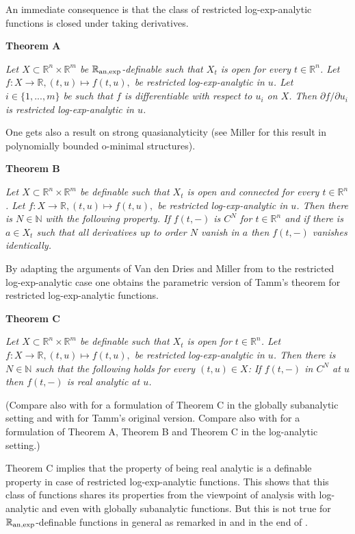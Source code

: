 \documentclass[12pt]{article}
\def\vs{\vspace}
\begin{document}
\vs{0.1cm}
An immediate consequence is that the class of restricted log-exp-analytic functions is closed under taking derivatives. 

\vs{0.4cm}
{\bf Theorem A}

\vs{0.1cm}
{\it
Let $X \subset \mathbb{R}^n \times \mathbb{R}^m$ be $\mathbb{R}_{\textnormal{an,exp}}$-definable such that $X_t$ is open for every $t \in \mathbb{R}^n$. Let $f:X \to \mathbb{R}, (t,u) \mapsto f(t,u),$ be restricted log-exp-analytic in $u$. Let $i \in \{1,...,m\}$ be such that $f$ is differentiable with respect to $u_i$ on $X$. Then $\partial f/\partial u_i$ is restricted log-exp-analytic in $u$.} 

\vs{0.3cm}
One gets also a result on strong quasianalyticity (see Miller \cite{9} for this result in polynomially bounded o-minimal structures).

\vs{0.4cm}
{\bf Theorem B}

\vs{0.1cm}
{\it
Let $X \subset \mathbb{R}^n \times \mathbb{R}^m$ be definable such that $X_t$ is open and connected for every $t \in \mathbb{R}^n$. Let $f:X \to \mathbb{R}, (t,u) \mapsto f(t,u),$ be restricted log-exp-analytic in $u$. Then there is $N \in \mathbb{N}$ with the following property. If $f(t,-)$ is $C^N$ for $t \in \mathbb{R}^n$ and if there is $a \in X_t$ such that all derivatives up to order $N$ vanish in $a$ then $f(t,-)$ vanishes identically.} 

\vs{0.2cm}
By adapting the arguments of Van den Dries and Miller from \cite{5} to the restricted log-exp-analytic case one obtains the parametric version of Tamm's theorem for restricted log-exp-analytic functions.

\vs{0.4cm}
{\bf Theorem C}

\vs{0.1cm}
{\it
Let $X \subset \mathbb{R}^n \times \mathbb{R}^m$ be definable such that $X_t$ is open for $t \in \mathbb{R}^n$. Let $f:X \to \mathbb{R}, (t,u) \mapsto f(t,u),$ be restricted log-exp-analytic in $u$. Then there is $N \in \mathbb{N}$ such that the following holds for every $(t,u) \in X$: If $f(t,-)$ in $C^N$ at $u$ then $f(t,-)$ is real analytic at $u$.} 

\vs{0.3cm}
(Compare also with \cite{5} for a formulation of Theorem C in the globally subanalytic setting and with \cite{11} for Tamm's original version. Compare also with \cite{7} for a formulation of Theorem A, Theorem B and Theorem C in the log-analytic setting.)

\vs{0.2cm}
Theorem C implies that the property of being real analytic is a definable property in case of restricted log-exp-analytic functions. This shows that this class of functions shares its properties from the viewpoint of analysis with log-analytic and even with globally subanalytic functions. But this is not true for $\mathbb{R}_{\textnormal{an,exp}}$-definable functions in general as remarked in \cite{7} and in the end of \cite{5}.
\end{document}

